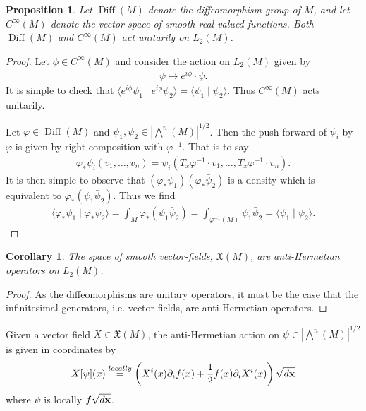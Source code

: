 \documentclass[12pt]{amsart}
\newtheorem{prop}{Proposition}
\newtheorem{cor}{Corollary}
\DeclareMathOperator{\Diff}{Diff}
\begin{document}
\begin{prop}
  Let $\Diff(M)$ denote the diffeomorphism group of $M$, and let $C^{\infty}(M)$ denote the vector-space of smooth real-valued functions.  Both $\Diff(M)$ and $C^{\infty}(M)$ act unitarily on $L_2(M)$.
\end{prop}
\begin{proof}
  Let $\phi \in C^{\infty}(M)$ and consider the action on $L_2(M)$ given by
  \begin{align*}
    \psi \mapsto e^{i \phi} \cdot \psi.
  \end{align*}
  It is simple to check that $\langle e^{i \phi} \psi_1 \mid e^{i \phi} \psi_2 \rangle = \langle \psi_1 \mid \psi_2 \rangle$.  Thus $C^\infty(M)$ acts unitarily.

  Let $\varphi \in \Diff(M)$ and $\psi_1,\psi_2 \in | \bigwedge^n(M) |^{1/2}$.  Then the push-forward of $\psi_i$ by $\varphi$ is given by right composition with $\varphi^{-1}$.  That is to say
  \begin{align*}
    \varphi_* \psi_i( v_1,\dots,v_n ) = \psi_i( T_x\varphi^{-1} \cdot v_1,\dots,T_x\varphi^{-1} \cdot v_n ).
  \end{align*}
  It is then simple to observe that $(\varphi_* \psi_1 ) (\varphi_* \bar{\psi}_2)$ is a density which is equivalent to $\varphi_*( \psi_1 \bar{\psi}_2)$.
  Thus we find
  \begin{align*}
    \langle \varphi_* \psi_1 \mid \varphi_* \psi_2 \rangle = \int_M \varphi_*( \psi_1 \bar{\psi}_2) = \int_{\varphi^{-1}(M)} \psi_1 \bar{\psi}_2 = \langle \psi_1 \mid \psi_2 \rangle.
  \end{align*}
\end{proof}

\begin{cor}
  The space of smooth vector-fields, $\mathfrak{X}(M)$, are anti-Hermetian operators on $L_2(M)$.
\end{cor}
\begin{proof}
  As the diffeomorphisms are unitary operators, it must be the case that the infinitesimal generators, i.e. vector fields, are anti-Hermetian operators.
\end{proof}

Given a vector field $X \in \mathfrak{X}(M)$, the anti-Hermetian action on $\psi \in |\bigwedge^n(M)|^{1/2}$ is given in coordinates by
\begin{align*}
  X[\psi](x) \stackrel{locally}{=} \left( X^i(x) \partial_i f(x) + \frac{1}{2} f(x) \partial_iX^i(x) \right) \sqrt{d {\bf x} }
\end{align*}
where $\psi$ is locally $f \sqrt{d {\bf x}}$.
\end{document}

